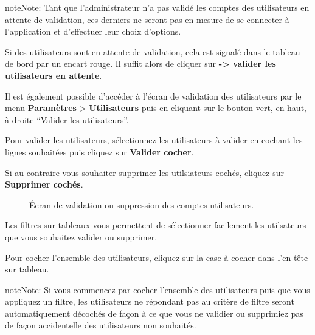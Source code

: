 \documentclass[letterpaper,10pt,french]{sphinxmanual}
\begin{document}
\begin{notice}{note}{Note:}
Tant que l'administrateur n'a pas validé les comptes des utilisateurs en attente de validation, ces derniers ne seront pas en mesure de se connecter à l'application et d'effectuer leur choix d'options.
\end{notice}

Si des utilisateurs sont en attente de validation, cela est signalé dans le tableau de bord par un encart rouge. Il suffit alors de cliquer sur \textbf{-\textgreater{} valider les utilisateurs en attente}.

Il est également possible d'accéder à l'écran de validation des utilisateurs par le menu \textbf{Paramètres} \textgreater{} \textbf{Utilisateurs} puis en cliquant sur le bouton vert, en haut, à droite ``Valider les utilisateurs''.

Pour valider les utilisateurs, sélectionnez les utilisateurs à valider en cochant les lignes souhaitées puis cliquez sur \textbf{Valider cocher}.

Si au contraire vous souhaiter supprimer les utilsiateurs cochés, cliquez sur \textbf{Supprimer cochés}.
\begin{figure}[htbp]
\centering
\capstart

\caption{Écran de validation ou suppression des comptes utilisateurs.}\end{figure}

Les filtres sur tableaux vous permettent de sélectionner facilement les utilsateurs que vous souhaitez valider ou supprimer.

Pour cocher l'ensemble des utilisateurs, cliquez sur la case à cocher dans l'en-tête sur tableau.

\begin{notice}{note}{Note:}
Si vous commencez par cocher l'ensemble des utilisateurs puis que vous appliquez un filtre, les utilisateurs ne répondant pas au critère de filtre seront automatiquement décochés de façon à ce que vous ne validier ou supprimiez pas de façon accidentelle des utilisateurs non souhaités.
\end{notice}
\end{document}
